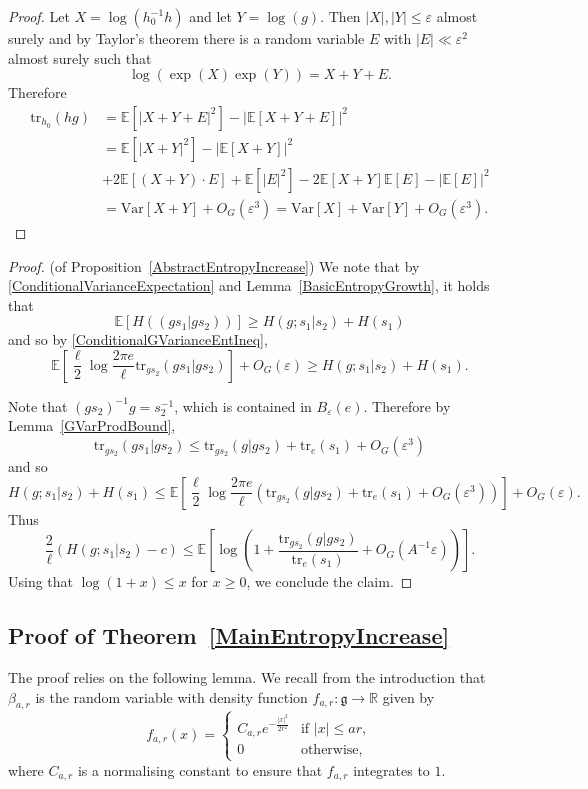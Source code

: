 \documentclass[10pt, english,oneside,reqno]{amsart}
\theoremstyle{plain}
\theoremstyle{remark}
\numberwithin{equation}{section}
\numberwithin{figure}{section}
\newcommand{\eps}{\varepsilon}
\newcommand{\tr}{\mathrm{tr}}
\newcommand{\R}{\mathbb{R}}
\newcommand{\E}{\mathbb{E}}
\begin{document}
\begin{proof}
    Let $X = \log(h_0^{-1}h)$ and let $Y = \log(g)$. Then $|X|, |Y| \leq \eps$ almost surely and by Taylor's theorem there is a random variable $E$ with $|E| \ll \eps^2$ almost surely such that $$\log(\exp(X)\exp(Y)) = X + Y + E.$$ Therefore 
    \begin{align*}
        \tr_{h_0}(hg) &= \E[|X + Y + E|^2] - |\E[X + Y + E]|^2 \\
        &=  \E[|X + Y|^2] - |\E[X + Y]|^2 \\ &+ 2 \mathbb{E}[(X + Y) \cdot E] + \mathbb{E}[|E|^2] - 2\mathbb{E}[X + Y]\mathbb{E}[E] - |\mathbb{E}[E]|^2\\
        &= \mathrm{Var}[X + Y] + O_G(\eps^3) =  \mathrm{Var}[X] + \mathrm{Var}[Y] + O_G(\eps^3).
    \end{align*}
\end{proof}



\begin{proof}(of Proposition~\ref{AbstractEntropyIncrease})
    We note that by \eqref{ConditionalVarianceExpectation} and Lemma~\ref{BasicEntropyGrowth}, it holds that $$\E[H((gs_1 | gs_2))]  \geq H(g; s_1|s_2) + H(s_1)$$ and so by \eqref{ConditionalGVarianceEntIneq},
    $$\E\left[ \frac{\ell}{2} \log \frac{2\pi e}{\ell} \tr_{gs_2}(gs_1|gs_2)   \right] + O_G(\eps) \geq H(g; s_1|s_2)  + H(s_1).$$

    Note that $(gs_2)^{-1}g = s_2^{-1}$, which is contained in $B_{\eps}(e)$. Therefore by Lemma~\ref{GVarProdBound}, $$\tr_{gs_2}(gs_1|gs_2) \leq \tr_{gs_2}(g|gs_2) + \tr_e(s_1) + O_G(\eps^3)$$ and so $$H(g; s_1|s_2)  + H(s_1) \leq \E\left[ \frac{\ell}{2} \log \frac{2\pi e}{\ell}\left(\tr_{gs_2}(g|gs_2) + \tr_e(s_1) + O_G(\eps^3) \right)  \right] + O_G(\eps).$$ Thus
    $$\frac{2}{\ell}\left(  H(g; s_1|s_2) - c \right) \leq \E\left[ \log \left( 1 + \frac{\tr_{gs_2}(g|gs_2)}{\tr_e(s_1)}  + O_G(A^{-1}\eps)   \right) \right].$$ Using that  $\log(1 + x)\leq x$ for $x\geq 0$, we conclude the claim. 
\end{proof}

\subsection{Proof of Theorem~\ref{MainEntropyIncrease}} \label{Entropy:BetweenScales}

The proof relies on the following lemma. We  recall from the introduction that  $\beta_{a,r}$ is the random variable with density function $f_{a,r}: \mathfrak{g} \to \R$ given by $$f_{a,r}(x) = \begin{cases}
    C_{a,r}e^{-\frac{|x|^2}{2r^2}} & \text{if } |x| \leq ar, \\
    0 &\text{otherwise},
    \end{cases}$$ where $C_{a,r}$ is a normalising constant to ensure that $f_{a,r}$ integrates to $1$.
\end{document}
